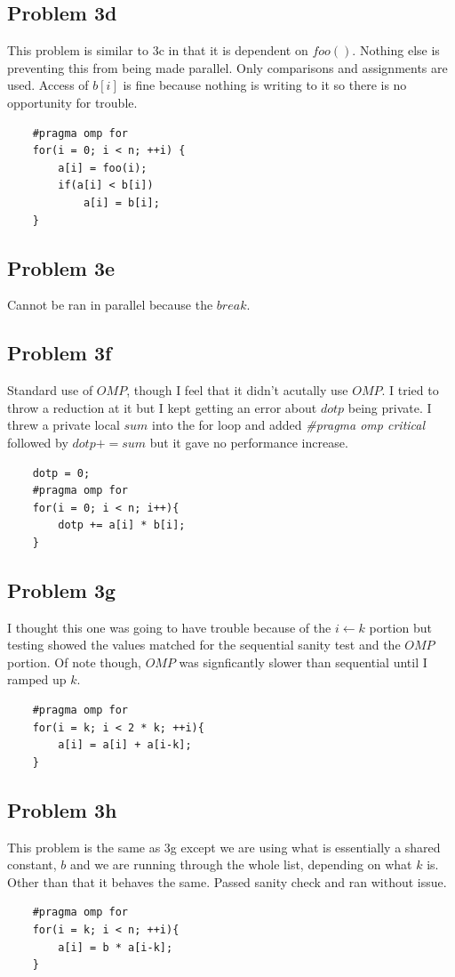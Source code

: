\documentclass{article}
\begin{document}
\subsection{Problem 3d}
This problem is similar to 3c in that it is dependent on $foo()$. Nothing else is preventing this from being made parallel. Only comparisons and assignments are used. Access of $b[i]$ is fine because nothing is writing to it so there is no opportunity for trouble.
\begin{verbatim}
    #pragma omp for
    for(i = 0; i < n; ++i) {
        a[i] = foo(i);
        if(a[i] < b[i])
            a[i] = b[i];
    }
\end{verbatim}

\subsection{Problem 3e}
Cannot be ran in parallel because the $break$. 

\subsection{Problem 3f}
Standard use of $OMP$, though I feel that it didn't acutally use $OMP$. I tried to throw a reduction at it but I kept getting an error about $dotp$ being private. I threw a private local $sum$ into the for loop and added \textit{#pragma omp critical} followed by $dotp += sum$ but it gave no performance increase.
\begin{verbatim}
    dotp = 0;
    #pragma omp for
    for(i = 0; i < n; i++){
        dotp += a[i] * b[i];
    }
\end{verbatim}

\subsection{Problem 3g}
I thought this one was going to have trouble because of the $i\gets k$ portion but testing showed the values matched for the sequential sanity test and the $OMP$ portion. Of note though, $OMP$ was signficantly slower than sequential until I ramped up $k$.
\begin{verbatim}
    #pragma omp for
    for(i = k; i < 2 * k; ++i){
        a[i] = a[i] + a[i-k];
    }
\end{verbatim}

\subsection{Problem 3h}
This problem is the same as 3g except we are using what is essentially a shared constant, $b$ and we are running through the whole list, depending on what $k$ is. Other than that it behaves the same. Passed sanity check and ran without issue.
\begin{verbatim}
    #pragma omp for
    for(i = k; i < n; ++i){
        a[i] = b * a[i-k];
    }
\end{verbatim}
\end{document}
